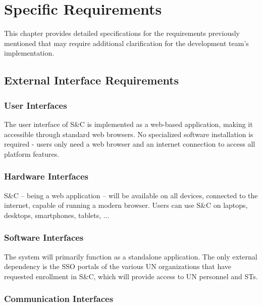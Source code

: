 \chapter{Specific Requirements}
\label{chap:specific-requirements}

\par This chapter provides detailed specifications for the requirements previously mentioned that may require
additional clarification for the development team's implementation.

\section{External Interface Requirements}
\label{sec:external-interface-requirements}

\subsection{User Interfaces}
\label{subsec:user-interfaces}

\par The user interface of S\&C is implemented as a web-based application, making it accessible through standard web
browsers. No specialized software installation is required - users only need a web browser and an internet connection
to access all platform features.

\subsection{Hardware Interfaces}
\label{subsec:hardware-interfaces}

\par S\&C – being a web application – will be available on all devices, connected to the internet, capable of running a
modern browser. Users can use S\&C on laptops, desktops, smartphones, tablets, ...

\subsection{Software Interfaces}
\label{subsec:software-interfaces}

\par The system will primarily function as a standalone application. The only external dependency is the SSO portals of
the various UN organizations that have requested enrollment in S\&C, which will provide access to UN personnel and STs.

\subsection{Communication Interfaces}
\label{subsec:communication-interfaces}


